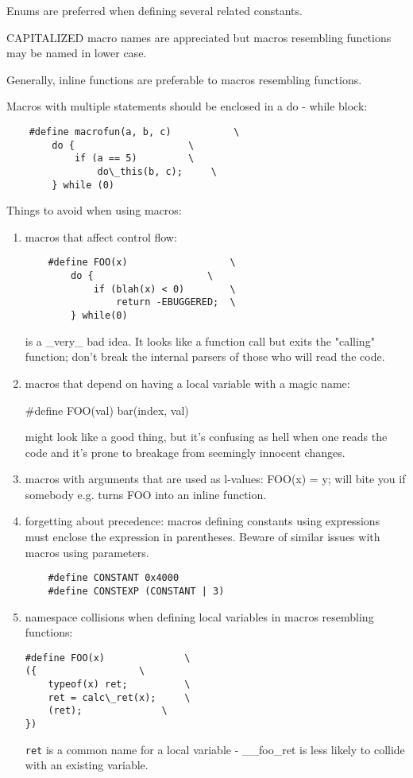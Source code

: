 \documentclass[pdftex,12pt, twocol]{article} %
\begin{document}
Enums are preferred when defining several related constants.

CAPITALIZED macro names are appreciated but macros resembling functions
may be named in lower case.

Generally, inline functions are preferable to macros resembling functions.

Macros with multiple statements should be enclosed in a do - while block:

\begin{verbatim}
	#define macrofun(a, b, c) 			\
		do {					\
			if (a == 5)			\
				do\_this(b, c);		\
		} while (0)
\end{verbatim}

Things to avoid when using macros:

\begin{enumerate}
\item macros that affect control flow:

\begin{verbatim}
	#define FOO(x)					\
		do {					\
			if (blah(x) < 0)		\
				return -EBUGGERED;	\
		} while(0)
\end{verbatim}

is a \_very\_ bad idea.  It looks like a function call but exits the "calling"
function; don't break the internal parsers of those who will read the code.

\item macros that depend on having a local variable with a magic name:

	\#define FOO(val) bar(index, val)

might look like a good thing, but it's confusing as hell when one reads the
code and it's prone to breakage from seemingly innocent changes.

\item macros with arguments that are used as l-values: FOO(x) = y; will
bite you if somebody e.g. turns FOO into an inline function.

\item forgetting about precedence: macros defining constants using expressions
must enclose the expression in parentheses. Beware of similar issues with
macros using parameters.

\begin{verbatim}
	#define CONSTANT 0x4000
	#define CONSTEXP (CONSTANT | 3)
\end{verbatim}

\item namespace collisions when defining local variables in macros resembling
functions:

\begin{verbatim}
#define FOO(x)				\
({					\
	typeof(x) ret;			\
	ret = calc\_ret(x);		\
	(ret);				\
})
\end{verbatim}

\verb+ret+ is a common name for a local variable - \_\_foo\_ret is less likely
to collide with an existing variable.
\end{enumerate}
\end{document}
